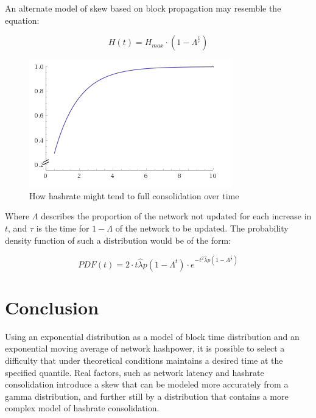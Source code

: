\documentclass[]{article}
\begin{document}
An alternate model of skew based on block propagation may resemble the equation: 

\begin{equation}
	H(t) = H_{max} \cdot (1 - \Lambda^\frac{t}{\tau})
\end{equation}

\begin{figure}[h]
	\centering
	\includegraphics[width=0.7\linewidth]{"./hashpower ramp"}
	\caption{\footnotesize How hashrate might tend to full consolidation over time \cite{Wolfram}}
\end{figure}

\pagebreak

Where $\Lambda$ describes the proportion of the network not updated for each increase in $t$, and $\tau$ is the time for $1 - \Lambda$ of the network to be updated. The probability density function of such a distribution would be of the form: 

\begin{equation}
PDF(t) = 2 \cdot t\hat{\lambda}p(1 - \Lambda^t) \cdot e^{-t^2\hat{\lambda}p(1 - \Lambda^\frac{t}{\tau})}
\end{equation}

\section{Conclusion}
Using an exponential distribution as a model of block time distribution and an exponential moving average of network hashpower, it is possible to select a difficulty that under theoretical conditions maintains a desired time at the specified quantile.  Real factors, such as network latency and hashrate consolidation introduce a skew that can be modeled more accurately from a gamma distribution, and further still by a distribution that contains a more complex model of hashrate consolidation. 



\end{document}
